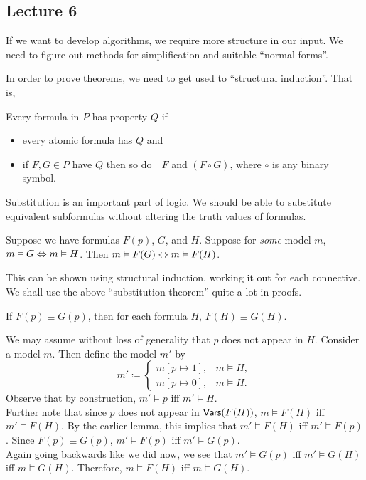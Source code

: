 \subsection{Lecture 6}

If we want to develop algorithms, we require more structure in our input. We need to figure out methods for simplification and suitable ``normal forms''.

In order to prove theorems, we need to get used to ``structural induction''. That is,

\begin{theorem}
	Every formula in $P$ has property $Q$ if
	\begin{itemize}
		\item every atomic formula has $Q$ and
		\item if $F,G\in P$ have $Q$ then so do $\neg F$ and $(F\circ G)$, where $\circ$ is any binary symbol.
	\end{itemize}
\end{theorem}

Substitution is an important part of logic. We should be able to substitute equivalent subformulas without altering the truth values of formulas.\\

\begin{lemma}
\label{lem: 6.2}
	Suppose we have formulas $F(p)$, $G$, and $H$. Suppose for \textit{some} model $m$, $m\vDash G\Leftrightarrow m\vDash H$. Then $m\vDash F(G) \Leftrightarrow m\vDash F(H)$.
\end{lemma}
This can be shown using structural induction, working it out for each connective.\\
We shall use the above ``substitution theorem'' quite a lot in proofs.

\begin{lemma}
	If $F(p)\equiv G(p)$, then for each formula $H$, $F(H)\equiv G(H)$.
\end{lemma}
We may assume without loss of generality that $p$ does not appear in $H$. Consider a model $m$. Then define the model $m'$ by
\[
	m'\coloneqq
	\begin{cases}
		m[p\mapsto 1], & m\vDash H, \\
		m[p\mapsto 0], & m\vDash H.
	\end{cases}
\]
Observe that by construction, $m'\vDash p$ iff $m'\vDash H$.\\
Further note that since $p$ does not appear in $\mathsf{Vars}(F(H))$, $m\vDash F(H)$ iff $m'\vDash F(H)$. By the earlier lemma, this implies that $m'\vDash F(H)$ iff $m'\vDash F(p)$.  Since $F(p)\equiv G(p)$, $m'\vDash F(p)$ iff $m'\vDash G(p)$.\\
Again going backwards like we did now, we see that $m'\vDash G(p)$ iff $m'\vDash G(H)$ iff $m\vDash G(H)$. Therefore, $m\vDash F(H)$ iff $m\vDash G(H)$.

